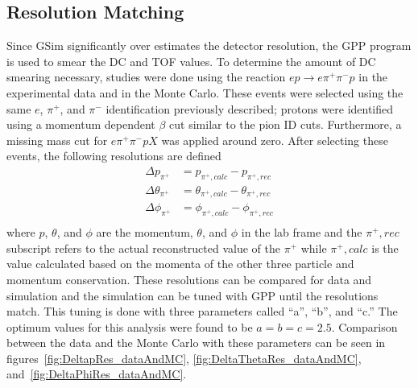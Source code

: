 \subsection{Resolution Matching}
\label{subsec:ResolutionMatching}
%
Since GSim significantly over estimates the detector resolution, the GPP program is used to smear the DC and TOF values.
To determine the amount of DC smearing necessary, studies were done using the reaction $ep \rightarrow e\pi^+ \pi^- p$ in the experimental data and in the Monte Carlo.
These events were selected using the same $e$, $\pi^+$, and $\pi^-$ identification previously described; protons were identified using a momentum dependent $\beta$ cut similar to the pion ID cuts.
Furthermore, a missing mass cut for $e \pi^+ \pi^- p X$ was applied around zero.
After selecting these events, the following resolutions are defined
%
\begin{equation}
\label{eq:resolutionDefinitions}
\begin{split}
\Delta p_{\pi^+} &= p_{\pi^+, calc} - p_{\pi^+, rec} \\
\Delta \theta_{\pi^+} &= \theta_{\pi^+, calc} - \theta_{\pi^+, rec} \\
\Delta \phi_{\pi^+} &= \phi_{\pi^+, calc} - \phi_{\pi^+, rec} \\
\end{split}
\end{equation}
%
where $p$, $\theta$, and $\phi$ are the momentum, $\theta$, and $\phi$ in the lab frame and the $\pi^+, rec$ subscript refers to the actual reconstructed value of the $\pi^+$ while $\pi^+, calc$ is the value calculated based on the momenta of the other three particle and momentum conservation.
These resolutions can be compared for data and simulation and the simulation can be tuned with GPP until the resolutions match.
This tuning is done with three parameters called ``a'', ``b'', and ``c.''
The optimum values for this analysis were found to be $a = b = c = 2.5$.
Comparison between the data and the Monte Carlo with these parameters can be seen in figures~\ref{fig:DeltapRes_dataAndMC}, \ref{fig:DeltaThetaRes_dataAndMC}, and~\ref{fig:DeltaPhiRes_dataAndMC}.
%
